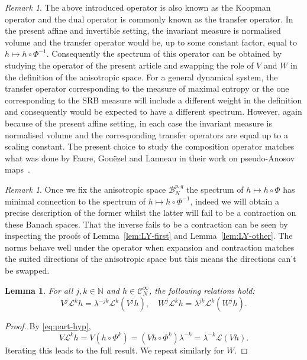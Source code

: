 \documentclass[a4paper,11pt]{amsart}
\newtheorem{lemma}[theorem]{Lemma}
\theoremstyle{remark}
\newtheorem{remark}[theorem]{Remark}
\newcommand{\cB}{\mathcal{B}} %
\newcommand{\cC}{\mathcal{C}} %
\newcommand{\cL}{\mathcal{L}} %
\newcommand{\bN}{\mathbb{N}} %
\newcommand{\dv}{V} %
\newcommand{\dw}{W} %
\begin{document}
\begin{remark}
    \label{rem:transfer-op}
    The above introduced operator is also known as the Koopman operator and the dual operator is commonly known as the transfer operator. 
    In the present affine and invertible setting, the invariant measure is normalised volume and the transfer operator would be, up to some constant factor, equal to \(h \mapsto h \circ \Phi^{-1}\). 
    Consequently the spectrum of this operator can be obtained by studying the operator of the present article and swapping the role of \(\dv\) and \(\dw\) in the definition of the anisotropic space.
    For a general dynamical system, the transfer operator corresponding to the measure of maximal entropy or the one corresponding to the SRB measure will include a different weight in the definition and consequently would be expected to have a different spectrum.
    However, again because of the present affine setting, in each case the invariant measure is normalised volume and the corresponding transfer operators are equal up to a scaling constant. 
    The present choice to study the composition operator matches what was done by Faure, Gouëzel and Lanneau in their work on pseudo-Anosov maps~\cite{FGL19}.
\end{remark}

\begin{remark}
    Once we fix the anisotropic space \(\cB^{p,q}_{N}\) the spectrum of \(h \mapsto h \circ \Phi\) has minimal connection to the spectrum of \(h \mapsto h \circ \Phi^{-1}\), indeed we will obtain a precise description of the former whilst the latter will fail to be a contraction on these Banach spaces.
    That the inverse fails to be a contraction can be seen by inspecting the proofs of Lemma~\ref{lem:LY-first} and Lemma~\ref{lem:LY-other}.
    The norms behave well under the operator when expansion and contraction matches the suited directions of the anisotropic space but this means the directions can't be swapped.
\end{remark}

\begin{lemma}
    \label{lem:XL-LX}
    For all \(j,k \in \bN\) and \(h\in \cC^{\infty}_{N}\), the following relations hold:
    \[
        \dv^{j}\cL^k h = \lambda^{-jk} \cL^k\left(\dv^{j}h\right),
        \quad  
        \dw^{j}\cL^k h = \lambda^{jk} \cL^k\left(\dw^{j}h\right).
    \]
\end{lemma}

\begin{proof}
    By \eqref{eq:part-hyp},
    \[
        \dv\cL^k h = \dv (h \circ \Phi^{k}) = (\dv h\circ \Phi^{k})\lambda^{-k} =  \lambda^{-k} \cL\left(\dv h\right).
    \]
    Iterating this leads to the full result.
    We repeat similarly for \(\dw\).
\end{proof}
\end{document}

